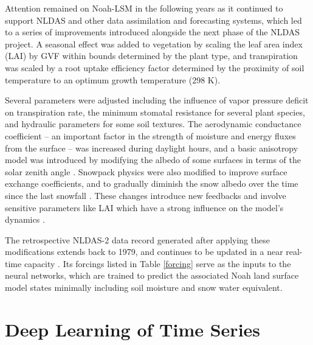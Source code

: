 Attention remained on Noah-LSM in the following years as it continued to support NLDAS and other data assimilation and forecasting systems, which led to a series of improvements introduced alongside the next phase of the NLDAS project. A seasonal effect was added to vegetation by scaling the leaf area index (LAI) by GVF within bounds determined by the plant type, and transpiration was scaled by a root uptake efficiency factor determined by the proximity of soil temperature to an optimum growth temperature (298 K).

Several parameters were adjusted including the influence of vapor pressure deficit on transpiration rate, the minimum stomatal resistance for several plant species, and hydraulic parameters for some soil textures. The aerodynamic conductance coefficient -- an important factor in the strength of moisture and energy fluxes from the surface -- was increased during daylight hours, and a basic anisotropy model was introduced by modifying the albedo of some surfaces in terms of the solar zenith angle \citep{wei_improvement_2011}. Snowpack physics were also modified to improve surface exchange coefficients, and to gradually diminish the snow albedo over the time since the last snowfall \citep{livneh_noah_2010}\citep{liang_simple_1994}. These changes introduce new feedbacks and involve sensitive parameters like LAI which have a strong influence on the model's dynamics \citep{rosero_quantifying_2010}.

The retrospective NLDAS-2 data record generated after applying these modifications extends back to 1979, and continues to be updated in a near real-time capacity \citep{xia_continental-scale_2012}. Its forcings listed in Table \ref{forcing} serve as the inputs to the neural networks, which are trained to predict the associated Noah land surface model states minimally including soil moisture and snow water equivalent.

\section{Deep Learning of Time Series}

